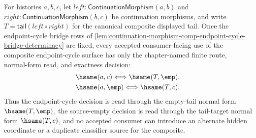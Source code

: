 \begin{corollary}
\label{cor:continuation-morphism-comp-endpoint-cycle-consumer-determinacy}
For histories $a,b,c$, let $left:\mathsf{ContinuationMorphism}(a,b)$ and
$right:\mathsf{ContinuationMorphism}(b,c)$ be continuation morphisms, and write
$T=\mathsf{tail}(left\circ right)$ for the canonical composite displayed tail.
Once the endpoint-cycle bridge rows of
\autoref{lem:continuation-morphism-comp-endpoint-cycle-bridge-determinacy} are
fixed, every accepted consumer-facing use of the composite endpoint-cycle
surface has only the chapter-named finite route, normal-form read, and exactness
decision:
$$
\begin{gathered}
\hsame(a,c)\Longleftrightarrow\hsame(T,\emp),\\
\hsame(a,\emp)\Longleftrightarrow\hsame(T,c).
\end{gathered}
$$
Thus the endpoint-cycle decision is read through the empty-tail normal form
$\hsame(T,\emp)$, the source-empty decision is read through the tail-target
normal form $\hsame(T,c)$, and no accepted consumer can introduce an alternate
hidden coordinate or a duplicate classifier source for the composite.
\end{corollary}
